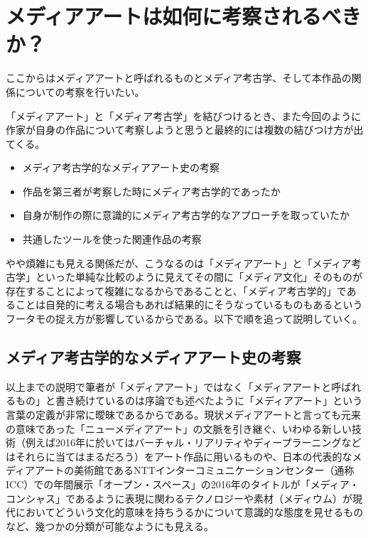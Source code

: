 \documentclass[a4paper,report]{jsbook}
\begin{document}
\section{メディアアートは如何に考察されるべきか？}\label{ux30e1ux30c7ux30a3ux30a2ux30a2ux30fcux30c8ux306fux5982ux4f55ux306bux8003ux5bdfux3055ux308cux308bux3079ux304dux304b}

ここからはメディアアートと呼ばれるものとメディア考古学、そして本作品の関係についての考察を行いたい。

「メディアアート」と「メディア考古学」を結びつけるとき、また今回のように作家が自身の作品について考察しようと思うと最終的には複数の結びつけ方が出てくる。

\begin{itemize}
\tightlist
\item
  メディア考古学的なメディアアート史の考察
\item
  作品を第三者が考察した時にメディア考古学的であったか
\item
  自身が制作の際に意識的にメディア考古学的なアプローチを取っていたか
\item
  共通したツールを使った関連作品の考察
\end{itemize}

やや煩雑にも見える関係だが、こうなるのは「メディアアート」と「メディア考古学」といった単純な比較のように見えてその間に「メディア文化」そのものが存在することによって複雑になるからであることと、「メディア考古学的」であることは自発的に考える場合もあれば結果的にそうなっているものもあるというフータモの捉え方が影響しているからである。以下で順を追って説明していく。

\subsection{メディア考古学的なメディアアート史の考察}\label{ux30e1ux30c7ux30a3ux30a2ux8003ux53e4ux5b66ux7684ux306aux30e1ux30c7ux30a3ux30a2ux30a2ux30fcux30c8ux53f2ux306eux8003ux5bdf}

以上までの説明で筆者が「メディアアート」ではなく「メディアアートと呼ばれるもの」と書き続けているのは序論でも述べたように「メディアアート」という言葉の定義が非常に曖昧であるからである。現状メディアアートと言っても元来の意味であった「ニューメディアアート」の文脈を引き継ぐ、いわゆる新しい技術（例えば2016年に於いてはバーチャル・リアリティやディープラーニングなどはそれらに当てはまるだろう）をアート作品に用いるものや、日本の代表的なメディアアートの美術館であるNTTインターコミュニケーションセンター（通称ICC）での年間展示「オープン・スペース」の2016年のタイトルが「メディア・コンシャス」であるように表現に関わるテクノロジーや素材（メディウム）が現代においてどういう文化的意味を持ちうるかについて意識的な態度を見せるものなど、幾つかの分類が可能なようにも見える。
\end{document}
